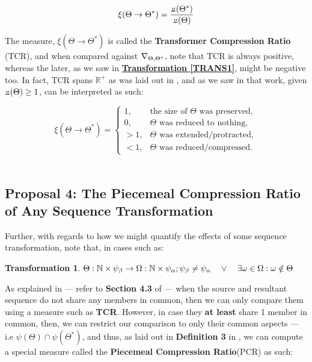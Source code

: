 \documentclass[12pt,a4paper]{article}
\newtheorem{trans}{Transformation}
\newcommand{\invpi}[1]{\mathop{\rotatebox[origin=c]{180}{$\pi$}}#1}
\newcommand{\invdel}[1]{\mathop{\rotatebox[origin=c]{180}{$\Delta$}}#1}
\begin{document}
\begin{equation}
\label{EQTCR}
\xi(\Theta \rightarrow \Theta^*) = \frac{\invpi(\Theta^*)}{\invpi(\Theta)}
\end{equation}

 The measure, $\xi(\Theta \rightarrow \Theta^*)$ is called the \textbf{Transformer Compression Ratio} (TCR), and when compared against $\invdel_{\Theta,\Theta^*}$, note that TCR is always positive, whereas the later, as we saw in  \textbf{\hyperref[TRANS1]{Transformation \ref{TRANS1}}}, might be negative too. In fact, TCR spans $\mathbb{R^+}$ as was laid out in \cite{transformatics}, and as we saw in that work, given $\invpi(\Theta) \geq 1$, can be interpreted as such:
 
 \begin{equation}
\label{EQTCRCASES}
\xi(\Theta \rightarrow \Theta^*) = \begin{cases}
1, & \text{the size of }\Theta \text{ was preserved},\\
0, & \Theta \text{ was reduced to nothing},\\
> 1, & \Theta \text{ was extended/protracted},\\
< 1, & \Theta \text{ was reduced/compressed}.
\end{cases}
\end{equation}\\

\subsection{Proposal 4: The Piecemeal Compression Ratio of Any Sequence Transformation\cite{transformatics}}

Further, with regards to how we might quantify the effects of some sequence transformation, note that, in cases such as:

\begin{trans}
\label{TRANSPCR}
$\Theta: \mathbb{N} \times \psi_\beta \rightarrow \Omega: \mathbb{N} \times \psi_\alpha;\\
\psi_\beta \neq \psi_\alpha \quad \lor \quad \exists \omega \in \Omega: \omega \notin \Theta$
\end{trans}

As explained in \cite{transformatics} --- refer to \textbf{Section 4.3} of \cite{transformatics} --- when the source and resultant sequence do not share any members in common, then we can only compare them using a measure such as \textbf{TCR}. However, in case they \textbf{at least} share 1 member in common, then, we can restrict our comparison to only their common aspects --- i.e $\psi(\Theta) \cap \psi(\Theta^*)$, and thus, as laid out in \textbf{Definition 3} in \cite{transformatics}, we can compute a special measure called the \textbf{Piecemeal Compression Ratio}(PCR) as such:\\
\end{document}
